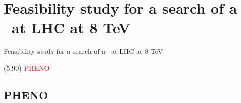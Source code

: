 \section[Pheno]{Feasibility study for a search of a \Tp~at LHC at 8 TeV}
\setcounter{tocdepth}{2}

\begin{frame}
\begin{center}
Feasibility study for a search of a \Tp~at LHC at 8 TeV
\end{center}
\begin{textblock}{50}(5,90)
\textcolor{red}{PHENO}
\end{textblock}
\end{frame}

\subsection{PHENO}


